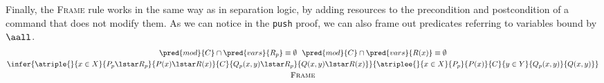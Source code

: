 Finally, the \textsc{Frame} rule works in the same way as in separation logic, by adding resources to the precondition and postcondition of a command that does not modify them. As we can notice in the \texttt{push} proof, we can also frame out predicates referring to variables bound by $\aall$.
\begin{gather*}
\pred{mod}{C} \cap \pred{vars}{R_p} \equiv \emptyset\ \
\pred{mod}{C} \cap \pred{vars}{R(x)} \equiv \emptyset \\
\infer
{
	\atriple
	{}
	{x \in X}
	{P_p \lstar R_p}
	{P(x) \lstar R(x)}
	{C}
	{Q_p(x, y) \lstar R_p}
	{Q(x, y) \lstar R(x)}
}
{
	\atriplee
	{}
	{x \in X}
	{P_p}
	{P(x)}
	{C}
	{y \in Y}
	{Q_p(x, y)}
	{Q(x, y)}
}
\\
\textsc{Frame}
\end{gather*}